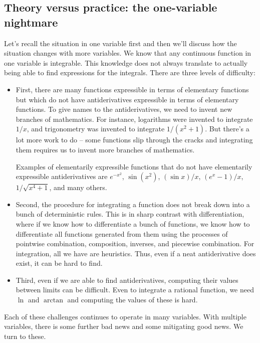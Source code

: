 \documentclass[10pt]{amsart}
\begin{document}
\subsection{Theory versus practice: the one-variable nightmare}

Let's recall the situation in one variable first and then we'll
discuss how the situation changes with more variables. We know that
any continuous function in one variable is integrable. This knowledge
does not always translate to actually being able to find expressions
for the integrals. There are three levels of difficulty:

\begin{itemize}
\item First, there are many functions expressible in terms of
  elementary functions but which do not have antiderivatives
  expressible in terms of elementary functions. To give names to the
  antiderivatives, we need to invent new branches of mathematics. For
  instance, logarithms were invented to integrate $1/x$, and
  trigonometry was invented to integrate $1/(x^2 + 1)$. But there's a
  lot more work to do -- some functions slip through the cracks and
  integrating them requires us to invent more branches of mathematics.

  Examples of elementarily expressible functions that do not have
  elementarily expressible antiderivatives are $e^{-x^2}$,
  $\sin(x^2)$, $(\sin x)/x$, $(e^x - 1)/x$, $1/\sqrt{x^4 + 1}$, and
  many others.
\item Second, the procedure for integrating a function does not break
  down into a bunch of deterministic rules. This is in sharp contrast
  with differentiation, where if we know how to differentiate a bunch
  of functions, we know how to differentiate all functions generated
  from them using the processes of pointwise combination, composition,
  inverses, and piecewise combination. For integration, all we have
  are heuristics. Thus, even if a neat antiderivative does exist, it
  can be hard to find.
\item Third, even if we are able to find antiderivatives, computing
  their values between limits can be difficult. Even to integrate a
  rational function, we need $\ln$ and $\arctan$ and computing the
  values of these is hard.
\end{itemize}

Each of these challenges continues to operate in many variables. With
multiple variables, there is some further bad news and some mitigating
good news. We turn to these.
\end{document}
